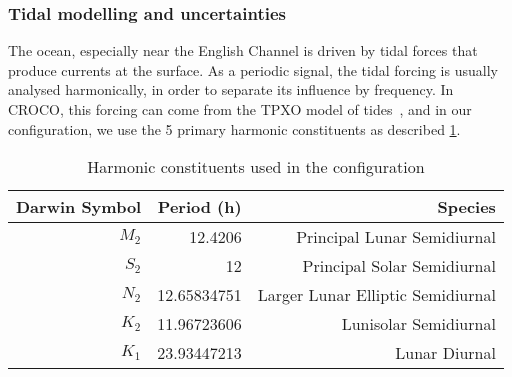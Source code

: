 \documentclass[../../Main_ManuscritThese.tex]{subfiles}
\newcommand{\CROCO}{CROCO}
\begin{document}
\subsubsection{Tidal modelling and uncertainties}
\label{ssec:tidal_modelling}
The ocean, especially near the English Channel is driven by tidal
forces that produce currents at the surface. As a periodic signal, the
tidal forcing is usually analysed harmonically, in order to separate
its influence by frequency. In \CROCO, this forcing can come from the
TPXO model of tides~\citep{egbert_efficient_2002}, and in our
configuration, we use the 5 primary harmonic constituents
as described \cref{tab:tides_components}.
\begin{table}[!h]
  \centering
  \begin{tabular}{rrr}\toprule
    Darwin Symbol & Period (h)   & Species                           \\ \midrule
    $M_2$         & 12.4206      & Principal Lunar Semidiurnal       \\
    $S_2$         & 12           & Principal Solar Semidiurnal       \\
    $N_2$         & 12.65834751  & Larger Lunar Elliptic Semidiurnal \\
    $K_2$         & 11.96723606  & Lunisolar Semidiurnal             \\
    $K_1$         & 23.93447213  & Lunar Diurnal                     \\
    \bottomrule
  \end{tabular}
  \caption{Harmonic constituents used in the configuration}
  \label{tab:tides_components}
\end{table}
\end{document}

